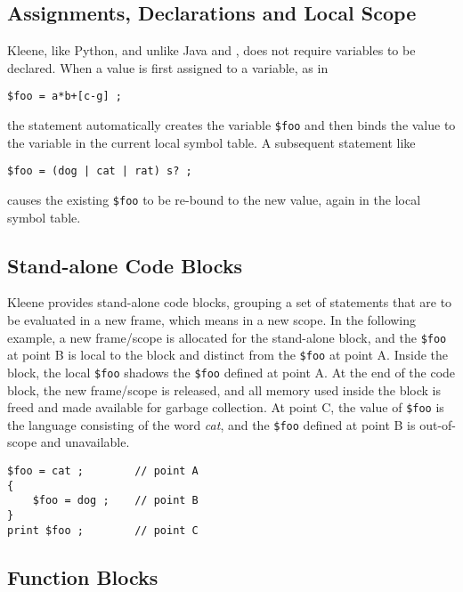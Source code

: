 \subsection{Assignments, Declarations and Local Scope}

Kleene, like Python, and unlike Java and \CPP{}, does not require
variables to be declared.
When a value is first assigned to a variable, as in

\begin{Verbatim}
$foo = a*b+[c-g] ;
\end{Verbatim}

\noindent
the statement automatically creates the variable \verb!$foo! and then binds
the \fsm{} value to the variable in the current local symbol table.  A
subsequent statement like

\begin{Verbatim}
$foo = (dog | cat | rat) s? ;
\end{Verbatim}

\noindent
causes the existing \verb!$foo! to be re-bound to the new \fsm{} 
value, again in the local symbol table.


\subsection{Stand-alone Code Blocks}

Kleene provides stand-alone code blocks, grouping a set of statements
that are to be evaluated in a new frame, which means in a new scope.
In the following example, a new frame/scope is allocated for the
stand-alone block, and the \verb!$foo! at point B is local to the block
and distinct from the
\verb!$foo! at point A. Inside the block, the local \verb!$foo! shadows
the \verb!$foo! defined at point A.  At the end of the code block, the new
frame/scope is released, and all memory used inside the block is freed
and made available for garbage collection.  At point C, the value of \verb!$foo! is the
language consisting of the word \emph{cat}, and the \verb!$foo! defined
at point B is out-of-scope and unavailable.

\begin{Verbatim}
$foo = cat ;        // point A
{
    $foo = dog ;    // point B
}
print $foo ;        // point C
\end{Verbatim}

\subsection{Function Blocks}


